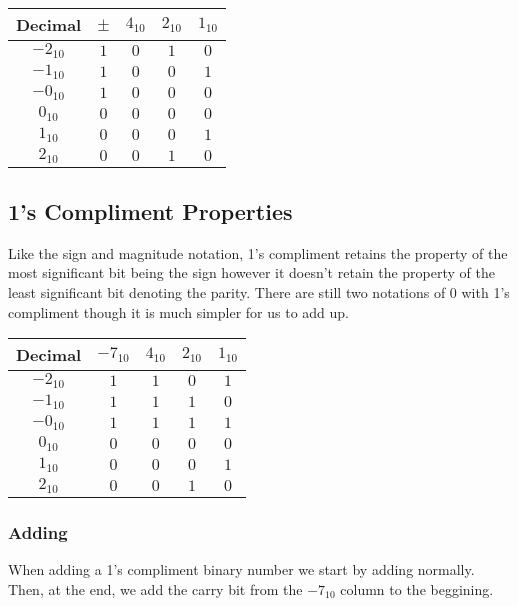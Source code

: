 \documentclass{article}
\begin{document}
\begin{center}
  \begin{tabular}{ | c | c | c | c | c | }
    \hline
    Decimal & $\pm$ & $4_{10}$ & $2_{10}$ & $1_{10}$\\ \hline
    $-2_{10}$ & $1$ & $0$ & $1$ & $0$\\ \hline
    $-1_{10}$ & $1$ & $0$ & $0$ & $1$\\ \hline
    $-0_{10}$ & $1$ & $0$ & $0$ & $0$\\ \hline
    $0_{10}$ & $0$ & $0$ & $0$ & $0$ \\ \hline
    $1_{10}$ & $0$ & $0$ & $0$ & $1$\\ \hline
    $2_{10}$ & $0$ & $0$ & $1$ & $0$ \\
    \hline
  \end{tabular}
\end{center}

\subsection{1's Compliment Properties}
Like the sign and magnitude notation, 1's compliment retains the property of
the most significant bit being the sign however it doesn't retain the property of 
the least significant bit denoting the parity. There are still two notations of 
$0$ with 1's compliment though it is much simpler for us to add up.

\begin{center}
  \begin{tabular}{ | c | c | c | c | c | }
    \hline
    Decimal & $-7_{10}$ & $4_{10}$ & $2_{10}$ & $1_{10}$\\ \hline
    $-2_{10}$ & $1$ & $1$ & $0$ & $1$\\ \hline
    $-1_{10}$ & $1$ & $1$ & $1$ & $0$\\ \hline
    $-0_{10}$ & $1$ &  $1$ & $1$ & $1$\\ \hline
    $0_{10}$ & $0$ &  $0$ & $0$ & $0$\\ \hline
    $1_{10}$ & $0$ & $0$ & $0$ & $1$\\ \hline
    $2_{10}$ & $0$ & $0$ & $1$ & $0$ \\
    \hline
  \end{tabular}
\end{center}

\break

\subsubsection{Adding}
When adding a 1's compliment binary number we start by adding normally. Then, at the end,
we add the carry bit from the $-7_{10}$ column to the beggining.
\end{document}
